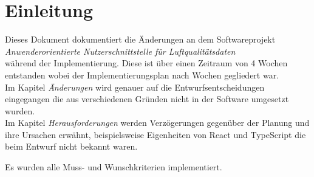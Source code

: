 \section{Einleitung}
Dieses Dokument dokumentiert die Änderungen an dem Softwareprojekt \\
\emph{Anwenderorientierte Nutzerschnittstelle für Luftqualitätsdaten}\\
während der Implementierung. Diese ist über einen Zeitraum von 4 Wochen entstanden wobei
der Implementierungsplan nach Wochen gegliedert war.\\

Im Kapitel \emph{Änderungen} wird genauer auf die Entwurfsentscheidungen eingegangen die 
aus verschiedenen Gründen nicht in der Software umgesetzt wurden.\\
Im Kapitel \emph{Herausforderungen} werden Verzögerungen gegenüber der Planung 
und ihre Ursachen erwähnt, beispielsweise Eigenheiten von React und TypeScript die beim
Entwurf nicht bekannt waren.

\bigskip
Es wurden alle Muss- und Wunschkriterien implementiert.